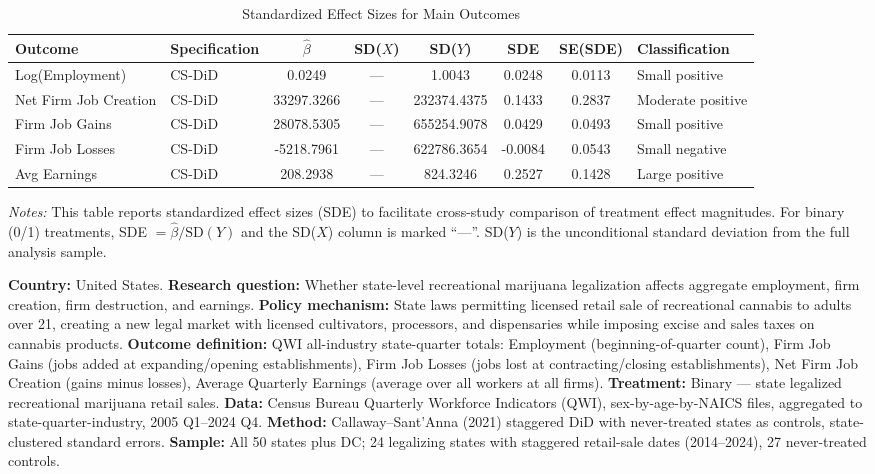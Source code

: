 \begin{table}[H]
\centering
\caption{Standardized Effect Sizes for Main Outcomes}
\label{tab:sde}
\begin{adjustbox}{max width=\textwidth}
\begin{tabular}{llcccccl}
\toprule
Outcome & Specification & $\hat{\beta}$ & SD($X$) & SD($Y$) & SDE & SE(SDE) & Classification \\
\midrule
Log(Employment) & CS-DiD & 0.0249 & --- & 1.0043 & 0.0248 & 0.0113 & Small positive \\
Net Firm Job Creation & CS-DiD & 33297.3266 & --- & 232374.4375 & 0.1433 & 0.2837 & Moderate positive \\
Firm Job Gains & CS-DiD & 28078.5305 & --- & 655254.9078 & 0.0429 & 0.0493 & Small positive \\
Firm Job Losses & CS-DiD & -5218.7961 & --- & 622786.3654 & -0.0084 & 0.0543 & Small negative \\
Avg Earnings & CS-DiD & 208.2938 & --- & 824.3246 & 0.2527 & 0.1428 & Large positive \\
\bottomrule
\end{tabular}
\end{adjustbox}
\par\vspace{0.3em}
{\footnotesize \emph{Notes:} This table reports standardized effect sizes (SDE) to facilitate cross-study comparison of treatment effect magnitudes. For binary (0/1) treatments, SDE $= \hat{\beta} / \text{SD}(Y)$ and the SD($X$) column is marked ``---''. SD($Y$) is the unconditional standard deviation from the full analysis sample.

\textbf{Country:} United States.
\textbf{Research question:} Whether state-level recreational marijuana legalization affects aggregate employment, firm creation, firm destruction, and earnings.
\textbf{Policy mechanism:} State laws permitting licensed retail sale of recreational cannabis to adults over 21, creating a new legal market with licensed cultivators, processors, and dispensaries while imposing excise and sales taxes on cannabis products.
\textbf{Outcome definition:} QWI all-industry state-quarter totals: Employment (beginning-of-quarter count), Firm Job Gains (jobs added at expanding/opening establishments), Firm Job Losses (jobs lost at contracting/closing establishments), Net Firm Job Creation (gains minus losses), Average Quarterly Earnings (average over all workers at all firms).
\textbf{Treatment:} Binary --- state legalized recreational marijuana retail sales.
\textbf{Data:} Census Bureau Quarterly Workforce Indicators (QWI), sex-by-age-by-NAICS files, aggregated to state-quarter-industry, 2005 Q1--2024 Q4.
\textbf{Method:} Callaway--Sant'Anna (2021) staggered DiD with never-treated states as controls, state-clustered standard errors.
\textbf{Sample:} All 50 states plus DC; 24 legalizing states with staggered retail-sale dates (2014--2024), 27 never-treated controls.

}
\end{table}
